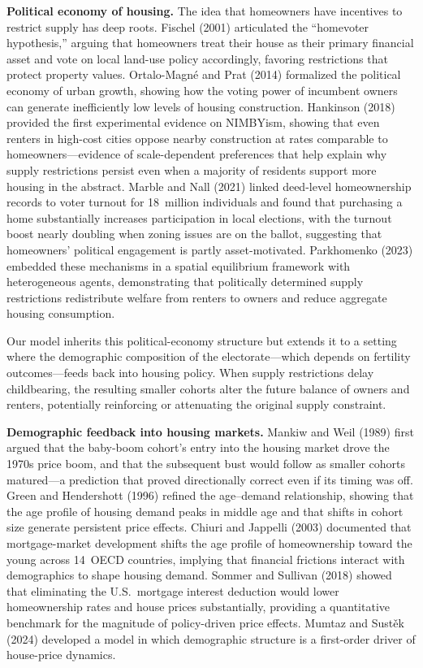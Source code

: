 \medskip
\noindent\textbf{Political economy of housing.}
The idea that homeowners have incentives to restrict supply has deep roots. Fischel (2001) articulated the ``homevoter hypothesis,'' arguing that homeowners treat their house as their primary financial asset and vote on local land-use policy accordingly, favoring restrictions that protect property values. Ortalo-Magn\'{e} and Prat (2014) formalized the political economy of urban growth, showing how the voting power of incumbent owners can generate inefficiently low levels of housing construction. Hankinson (2018) provided the first experimental evidence on NIMBYism, showing that even renters in high-cost cities oppose nearby construction at rates comparable to homeowners---evidence of scale-dependent preferences that help explain why supply restrictions persist even when a majority of residents support more housing in the abstract. Marble and Nall (2021) linked deed-level homeownership records to voter turnout for 18~million individuals and found that purchasing a home substantially increases participation in local elections, with the turnout boost nearly doubling when zoning issues are on the ballot, suggesting that homeowners' political engagement is partly asset-motivated. Parkhomenko (2023) embedded these mechanisms in a spatial equilibrium framework with heterogeneous agents, demonstrating that politically determined supply restrictions redistribute welfare from renters to owners and reduce aggregate housing consumption.

Our model inherits this political-economy structure but extends it to a setting where the demographic composition of the electorate---which depends on fertility outcomes---feeds back into housing policy. When supply restrictions delay childbearing, the resulting smaller cohorts alter the future balance of owners and renters, potentially reinforcing or attenuating the original supply constraint.

\medskip
\noindent\textbf{Demographic feedback into housing markets.}
Mankiw and Weil (1989) first argued that the baby-boom cohort's entry into the housing market drove the 1970s price boom, and that the subsequent bust would follow as smaller cohorts matured---a prediction that proved directionally correct even if its timing was off. Green and Hendershott (1996) refined the age--demand relationship, showing that the age profile of housing demand peaks in middle age and that shifts in cohort size generate persistent price effects. Chiuri and Jappelli (2003) documented that mortgage-market development shifts the age profile of homeownership toward the young across 14~OECD countries, implying that financial frictions interact with demographics to shape housing demand. Sommer and Sullivan (2018) showed that eliminating the U.S.\ mortgage interest deduction would lower homeownership rates and house prices substantially, providing a quantitative benchmark for the magnitude of policy-driven price effects. Mumtaz and Sust\v{e}k (2024) developed a model in which demographic structure is a first-order driver of house-price dynamics.

